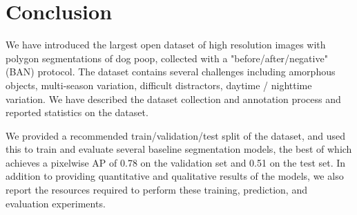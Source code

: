 \documentclass[10pt,twocolumn,letterpaper]{article}
\begin{document}







\section{Conclusion}

We have introduced the largest open dataset of high resolution images with polygon
  segmentations of dog poop, collected with a "before/after/negative" (BAN) protocol.
The dataset contains several challenges including amorphous objects, multi-season variation, difficult
  distractors, daytime / nighttime variation.
We have described the dataset collection and annotation process and reported statistics on the dataset.

We provided a recommended train/validation/test split of the dataset, and used this to train and evaluate
  several baseline segmentation models, the best of which achieves a pixelwise AP of 0.78 on the validation
  set and 0.51 on the test set.
In addition to providing quantitative and qualitative results of the models, we also report the resources
  required to perform these training, prediction, and evaluation experiments.
\end{document}

